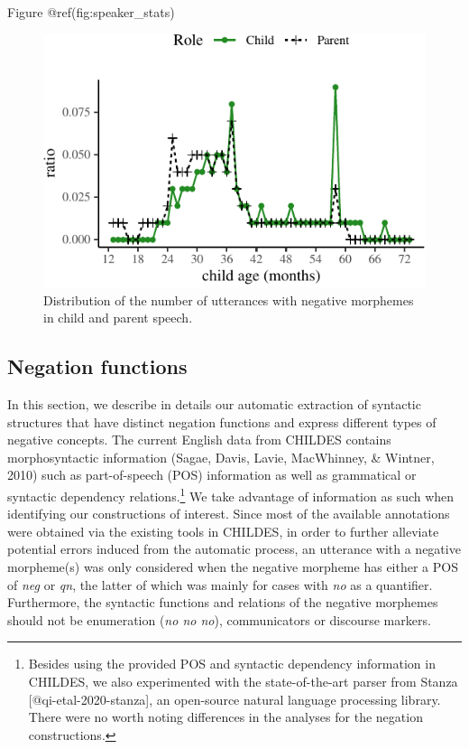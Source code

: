 \documentclass[10pt, letterpaper]{article}
\newenvironment{CodeChunk}{}{}
\begin{document}
Figure @ref(fig:speaker\_stats)

\begin{CodeChunk}
\begin{figure}[H]

{\centering \includegraphics{figs/speaker_stats-1} 

}

\caption[Distribution of the number of utterances with negative morphemes in child and parent speech]{Distribution of the number of utterances with negative morphemes in child and parent speech.}\label{fig:speaker_stats}
\end{figure}
\end{CodeChunk}

\hypertarget{negation-functions}{%
\subsection{Negation functions}\label{negation-functions}}

In this section, we describe in details our automatic extraction of
syntactic structures that have distinct negation functions and express
different types of negative concepts. The current English data from
CHILDES contains morphosyntactic information (Sagae, Davis, Lavie,
MacWhinney, \& Wintner, 2010) such as part-of-speech (POS) information
as well as grammatical or syntactic dependency
relations.\footnote{Besides using the provided POS and syntactic dependency information in CHILDES, we also experimented with the state-of-the-art parser from Stanza [@qi-etal-2020-stanza], an open-source natural language processing library. There were no worth noting differences in the analyses for the negation constructions.}
We take advantage of information as such when identifying our
constructions of interest. Since most of the available annotations were
obtained via the existing tools in CHILDES, in order to further
alleviate potential errors induced from the automatic process, an
utterance with a negative morpheme(s) was only considered when the
negative morpheme has either a POS of \emph{neg} or \emph{qn}, the
latter of which was mainly for cases with \emph{no} as a quantifier.
Furthermore, the syntactic functions and relations of the negative
morphemes should not be enumeration (\emph{no no no}), communicators or
discourse markers.
\end{document}
